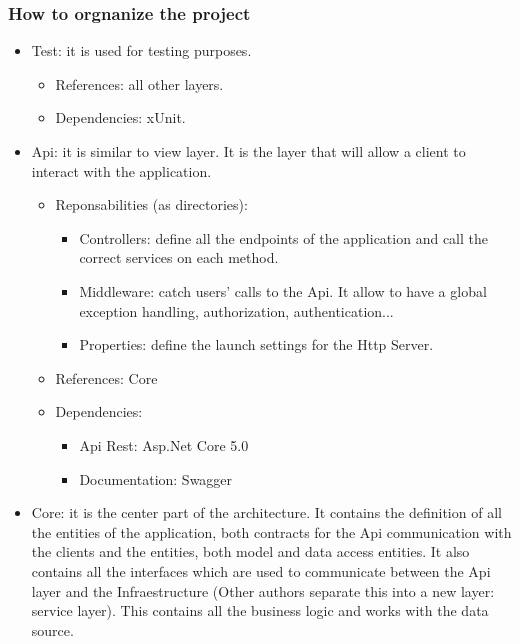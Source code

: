         \subsubsection{How to orgnanize the project}
        \begin{itemize}[noitemsep]
            \item Test: it is used for testing purposes.
                \begin{itemize}[noitemsep]
                    \item References: all other layers.
                    \item Dependencies: xUnit.
                \end{itemize}
            \item Api: it is similar to view layer. It is the layer that will allow a client to interact with the application.
                \begin{itemize}[noitemsep]
                   \item Reponsabilities (as directories):
                        \begin{itemize}[noitemsep]
                            \item Controllers: define all the endpoints of the application and call the correct services on each method.
                            \item Middleware: catch users' calls to the Api. It allow to have a global exception handling, authorization, authentication...
                            \item Properties: define the launch settings for the Http Server.
                        \end{itemize}
                    \item References: Core
                    \item Dependencies:
                        \begin{itemize}[noitemsep]
                            \item Api Rest: Asp.Net Core 5.0
                            \item Documentation: Swagger
                        \end{itemize}
                \end{itemize}
            \item Core: it is the center part of the architecture. It contains the definition of all the entities of the application, both contracts for the Api communication with the clients and the entities, both model and data access entities. It also contains all the interfaces which are used to communicate between the Api layer and the Infraestructure (Other authors separate this into a new layer: service layer). This contains all the business logic and works with the data source.

\end{itemize}
